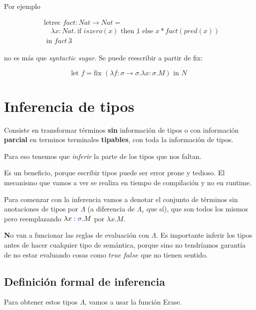 \documentclass{report}
\theoremstyle{definition} %
\newenvironment{nota}[1]
    {\begin{leftbar}\textbf{#1}}
    {\end{leftbar}}
\newcommand{\tfunc}[2]{#1 \to #2}
\newcommand{\ifte}[3]{\ \text{if } #1 \text{ then } #2 \text{ else } #3}
\newcommand{\abs}[3]{\lambda #1 : #2 . #3}
\newcommand{\app}[2]{#1 \ #2} %
\newcommand{\uabs}[2]{\lambda #1 . #2} %
\newcommand{\iszero}[1]{iszero(#1)}
\newcommand{\num}[1]{\underbar{#1}} %
\newcommand{\uletin}[3]{\text{let } #1 = #2 \text{ in } #3} %
\newcommand{\fix}[1]{\text{fix } #1}
\newcommand{\letrec}[4]{\text{letrec } #1 : #2 = #3 \text{ in } #4}
\newcommand{\select}[1]{\textcolor{blue}{#1}}
\newcommand{\untypedTerms}{\Lambda}
\newcommand{\typedTerms}{\Lambda_\tau}
\begin{document}
Por ejemplo

\begin{align*}
    &\letrec
        {fact}
        {\tfunc{Nat}{Nat}}
        {\\ &\quad
            \abs
                {x}
                {Nat}
                {\ifte{\iszero{x}}{\num{1}}{x * fact(pred(x))}}\\&
        }
        {fact\ \num{3}}
\end{align*}

no es más que \textit{syntactic sugar}. Se puede reescribir a partir de
fix:

\[
    \uletin
        {f}
        {
            \fix{(
                \abs{f}
                    {\tfunc{\sigma}{\sigma}}
                    {\abs{x}{\sigma}{M}}
            )}
        }
        {N}
\]

\section{Inferencia de tipos}

Consiste en transformar términos \textbf{sin} información de tipos o con
información \textbf{parcial} en terminos terminales \textbf{tipables}, con toda
la información de tipos.

Para eso tenemos que \textit{inferir} la parte de los tipos que nos faltan.

Es un beneficio, porque escribir tipos puede ser error prone y tedioso. El
mecanismo que vamos a ver se realiza en tiempo de compilación y no en runtime.

Para comenzar con la inferencia vamos a denotar el conjunto de términos sin
anotaciones de tipos por $\untypedTerms$ (a diferencia de $\typedTerms$ que sí),
que son todos los mismos pero reemplazando $\abs{x}{\select{\sigma}}{M}$ por
$\uabs{x}{M}$.

\begin{nota}
    No van a funcionar las reglas de evaluación con $\untypedTerms$.
    Es importante inferir los tipos antes de hacer cualquier tipo de semántica,
    porque sino no tendríamos garantía de no estar evaluando cosas como
    $\app{true}{false}$ que no tienen sentido.
\end{nota}

\subsection{Definición formal de inferencia}

Para obtener estos tipos $\untypedTerms$, vamos a usar la función Erase.
\end{document}
